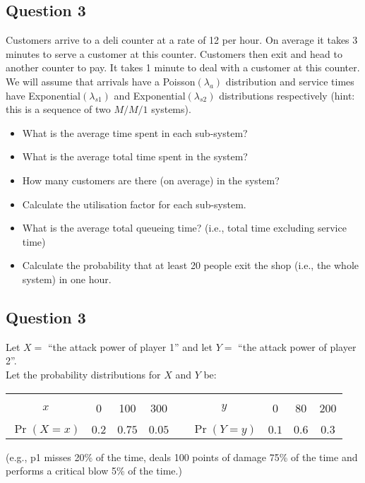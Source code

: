 \documentclass[]{report}
\begin{document}

\subsection*{Question 3}
Customers arrive to a deli counter at a rate of 12 per hour. On average it takes 3 minutes to serve a customer at this counter. Customers then exit and head to another counter to pay. It takes 1 minute to deal with a customer at this counter. We will assume that arrivals have a Poisson$(\lambda_a)$ distribution and service times have Exponential$(\lambda_{s1})$ and Exponential$(\lambda_{s2})$ distributions respectively (hint: this is a sequence of two $M/M/1$ systems).\\[-0.2cm]

\begin{itemize}
\item[(a)] What is the average time spent in each sub-system?  \item[(b)] What is the average total time spent in the system?  \item[(c)] How many customers are there (on average) in the system?   \\\item[(d)] Calculate the utilisation factor for each sub-system.  \item[(e)] What is the average total queueing time? (i.e., total time excluding service time)  \item[(f)] Calculate the probability that at least 20 people exit the shop (i.e., the whole system) in one hour.
\end{itemize}
\subsection*{Question 3}
Let $X =$ ``the attack power of player 1'' and let $Y =$ ``the attack power of player 2''.\\[-0.3cm]

Let the probability distributions for $X$ and $Y$ be:
\begin{center}
\begin{tabular}{|c|ccc|c|c|ccc|}
\cline{1-4}\cline{6-9}
&&&&&&&&\\[-0.4cm]
$x$ & 0 & 100 & 300 & \qquad\qquad & $y$ & 0 & 80 & 200\\
\cline{1-4}\cline{6-9}
&&&&&&&&\\[-0.4cm]
$\Pr(X=x)$ & $0.2$ & $0.75$ & $0.05$ & & $\Pr(Y=y)$ & $0.1$ & $0.6$ & $0.3$ \\[0.1cm]
\cline{1-4}\cline{6-9}
\end{tabular}
\end{center}
{\footnotesize(e.g., p1 misses 20\% of the time, deals 100 points of damage 75\% of the time and performs a critical blow 5\% of the time.)}\\[-0.2cm]
\end{document}
